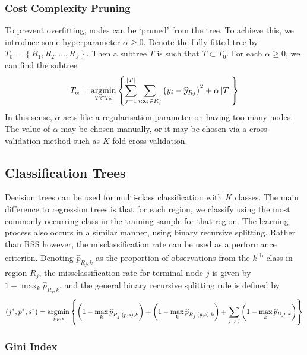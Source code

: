 \documentclass[11pt]{report} %
\begin{document}
\subsubsection{Cost Complexity Pruning}

To prevent overfitting, nodes can be `pruned' from the tree. To achieve this, we introduce some hyperparameter $\alpha \geq 0$. Denote the fully-fitted tree by $T_{0}  = \left\{R_{1}, R_{2}, \dots, R_{J}\right\}$. Then a subtree $T$ is such that $T \subset T_{0}$. For each $\alpha \geq 0$, we can find the subtree
\begin{equation}
T_{\alpha} = \operatorname*{argmin}_{T \subset T_{0}}\left\{\sum_{j = 1}^{\left|T\right|}\sum_{i: \mathbf{x}_{i}\in R_{j}}\left(y_{i} - \widehat{y}_{R_{j}}\right)^{2} + \alpha\left|T\right|\right\}
\end{equation}
In this sense, $\alpha$ acts like a regularisation parameter on having too many nodes. The value of $\alpha$ may be chosen manually, or it may be chosen via a cross-validation method such as $K$-fold cross-validation.

\subsection{Classification Trees}

Decision trees can be used for multi-class classification with $K$ classes. The main difference to regression trees is that for each region, we classify using the most commonly occurring class in the training sample for that region. The learning process also occurs in a similar manner, using binary recursive splitting. Rather than RSS however, the misclassification rate can be used as a performance criterion. Denoting $\widehat{p}_{R_{j}, k}$ as the proportion of observations from the $k$\textsuperscript{th} class in region $R_{j}$, the missclassification rate for terminal node $j$ is given by $1 - \max_{k}\widehat{p}_{R_{j}, k}$, and the general binary recursive splitting rule is defined by
\begin{equation}
\left(j^{*}, p^{*}, s^{*}\right) = \operatorname*{argmin}_{j, p, s}\left\{\left(1 - \max_{k}\widehat{p}_{R_{j}^{-}\left(p, s\right), k}\right) + \left(1 - \max_{k}\widehat{p}_{R_{j}^{+}\left(p, s\right), k}\right) + \sum_{j' \neq j}\left(1 - \max_{k}\widehat{p}_{R_{j'}, k}\right)\right\}
\end{equation}

\subsubsection{Gini Index}
\end{document}
